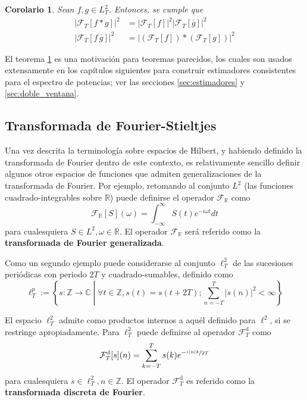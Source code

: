 \documentclass[12pt,letterpaper]{book}
\newtheorem{corolario}[teorema]{Corolario}
\newcommand{\R}{\mathbb{R}}
\newcommand{\C}{\mathbb{C}}
\newcommand{\Z}{\mathbb{Z}}
\newcommand{\intR}{\int_{-\infty}^{\infty}}
\newcommand{\abso}[1]{\left| #1 \right|}
\newcommand{\talque}{\mathrel{}\middle|\mathrel{}}
\begin{document}
\begin{corolario}
Sean $f, g \in L^{2}_T$. Entonces, se cumple que
\begin{align}
\abso{\mathcal{F}_T[f \ast g]}^{2} &= \abso{ \mathcal{F}_T[f] }^{2} \abso{ \mathcal{F}_T[\overline{g}] }^{2} \\
\abso{\mathcal{F}_T[ f\, \overline{g}]}^{2} &= \abso{ \left( \mathcal{F}_T[f] \right) \ast \left( \mathcal{F}_T[g] \right)}^{2}
\end{align}
\label{teo:convolucion}
\end{corolario}

El teorema \ref{teo:convolucion} es una motivación para teoremas parecidos, los cuales son usados extensamente en los capítulos siguientes para construir estimadores consistentes para el espectro de potencias; ver las secciones \ref{sec:estimadores} y \ref{sec:doble_ventana}.


\subsection{Transformada de Fourier-Stieltjes}
\label{lazy:fourier_stieltjes}

Una vez descrita la terminología sobre espacios de Hilbert, y habiendo definido la transformada de Fourier dentro de este contexto, es relativamente sencillo definir algunos otros espacios de funciones que admiten generalizaciones de la transformada de Fourier.
%
Por ejemplo, retomando al conjunto $L^{2}$  (las funciones cuadrado-integrables sobre $\R$) puede definirse el operador $\mathcal{F}_\R$ como
\begin{equation}
\mathcal{F}_\R[S](\omega) = \intR S(t) e^{-{ i \omega t}} dt
\end{equation}
para cualesquiera $S \in L^{2}, \omega \in \R$. El operador $\mathcal{F}_\R$ será referido como la \textbf{transformada de Fourier generalizada}.

Como un segundo ejemplo puede considerarse al conjunto $\ell^{2}_T$ de las sucesiones periódicas con periodo $2T$ y cuadrado-sumables, definido como
\begin{equation}
\ell^{p}_T := \left\{ s: \Z\rightarrow\C \talque \forall t\in \Z, s(t) = s(t+2T) ; \sum_{n=-T}^{T} \abso{s(n)}^{2} < \infty \right\}
\end{equation}

El espacio $\ell^{2}_T$ admite como productos internos a aquél definido para $\ell^{2}$, si se restringe apropiadamente.
%
Para $\ell^{2}_T$ puede definirse al operador $\mathcal{F}_T^{\text{d}}$ como
\begin{equation}
\mathcal{F}_T^{\text{d}}[s](n) = \sum_{k=-T}^{T} s(k) e^{-\nicefrac{ i \abso{n} k}{2T}}
\end{equation}
para cualesquiera $s \in \ell^{2}_T, n \in \Z$. El operador $\mathcal{F}_T^{\text{d}}$ es referido como la \textbf{transformada discreta de Fourier}.
\end{document}
